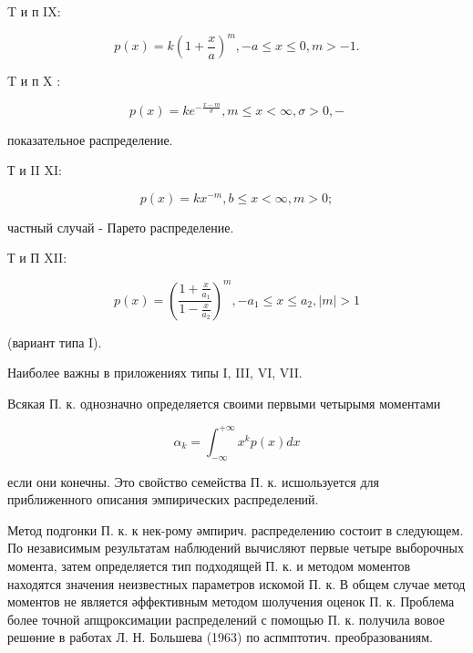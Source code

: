 \documentclass[10pt]{article}
\begin{document}
T и п IX:



\[

p(x)=k\left(1+\frac{x}{a}\right)^{m},-a \leqslant x \leqslant 0, m>-1 .

\]



$\mathrm{T}$ и п $\mathrm{X}$ :



\[

p(x)=k e^{-\frac{x-m}{\sigma}}, m \leqslant x<\infty, \sigma>0,-

\]



показательное распределение.



Т и II XI:



\[

p(x)=k x^{-m}, b \leqslant x<\infty, m>0 ;

\]



частный случай - Парето распределение.



Т и П XII:



\[

p(x)=\left(\frac{1+\frac{x}{a_{1}}}{1-\frac{x}{a_{2}}}\right)^{m},-a_{1} \leqslant x \leqslant a_{2},|m|>1

\]



(вариант типа I).



Наиболее важны в приложениях типы I, III, VI, VII.



Всякая П. к. однозначно определяется своими первыми четырымя моментами



\[

\alpha_{k}=\int_{-\infty}^{+\infty} x^{k} p(x) d x

\]



если они конечны. Это свойство семейства П. к. исшользуется для приближенного описания эмпирических распределений.



Метод подгонки П. к. к нек-рому әмпирич. распределению состоит в следующем. По независимым результатам наблюдений вычисляют первые четыре выборочных момента, затем определяется тип подходящей П. к. и методом моментов находятся значения неизвестных параметров искомой П. к. В общем случае метод моментов не является әффективным методом шолучения оценок П. к. Проблема более точной апщроксимации распределений с помощью П. к. получила вовое решөние в работах Л. Н. Большева (1963) по аспмптотич. преобразованиям.
\end{document}
